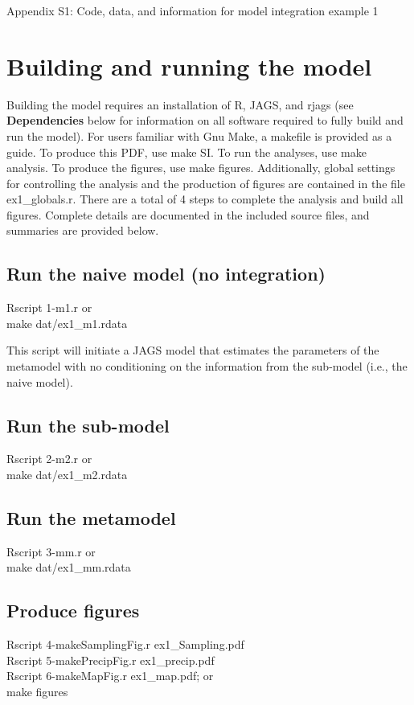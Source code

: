 \documentclass[11pt]{article}
\newcommand{\code}[1]{\colorbox{light-gray}{\ttfamily #1}}
\begin{document}
%
%


%
%

{\Large \flushleft
Appendix S1: Code, data, and information for model integration example 1
}

\section{Building and running the model}
Building the model requires an installation of R, JAGS, and rjags (see \textbf{Dependencies} below for information on all software required to fully build and run the model).
For users familiar with Gnu Make, a makefile is provided as a guide.
To produce this PDF, use \code{make SI}. 
To run the analyses, use \code{make analysis}.
To produce the figures, use \code{make figures}.
Additionally, global settings for controlling the analysis and the production of figures are contained in the file \code{ex1_globals.r}.
There are a total of 4 steps to complete the analysis and build all figures.
Complete details are documented in the included source files, and summaries are provided below.

\subsection{Run the naive model (no integration)}
\code{Rscript 1-m1.r} or \\
\code{make dat/ex1_m1.rdata}

This script will initiate a JAGS model that estimates the parameters of the metamodel with no conditioning on the information from the sub-model (i.e., the naive model).

\subsection{Run the sub-model}
\code{Rscript 2-m2.r} or \\
\code{make dat/ex1_m2.rdata}

\subsection{Run the metamodel}
\code{Rscript 3-mm.r} or \\
\code{make dat/ex1_mm.rdata}

\subsection{Produce figures}
\code{Rscript 4-makeSamplingFig.r ex1_Sampling.pdf} \\
\code{Rscript 5-makePrecipFig.r ex1_precip.pdf} \\
\code{Rscript 6-makeMapFig.r ex1_map.pdf}; or \\
\code{make figures}
\end{document}
